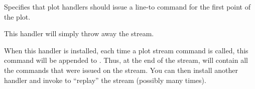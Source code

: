 \begin{command}{\pgfsetlinetofirstplotpoint}
  Specifies that  plot handlers should issue a line-to command for the
  first point of the plot.

\begin{codeexample}[]
\begin{pgfpicture}
  \pgfpathmoveto{\pgfpointorigin}
  \pgfsetlinetofirstplotpoint
  \pgfplothandlerlineto
  \pgfplotstreamstart
  \pgfplotstreampoint{\pgfpoint{1cm}{0cm}}
  \pgfplotstreampoint{\pgfpoint{2cm}{1cm}}
  \pgfplotstreampoint{\pgfpoint{3cm}{2cm}}
  \pgfplotstreampoint{\pgfpoint{1cm}{2cm}}
  \pgfplotstreamend
\end{pgfpicture}
\end{codeexample}
\end{command}

\begin{command}{\pgfplothandlerdiscard}
  This handler will simply throw away the stream.
\end{command}

\begin{command}{\pgfplothandlerrecord{}}
  When this handler is installed, each time a plot stream command is
  called, this command will be appended to . Thus, at
  the end of the stream,  will contain all the
  commands that were issued on the stream. You can then install
  another handler and invoke  to ``replay'' the stream
  (possibly many times).
 
\begin{codeexample}[]
\begin{pgfpicture}
  \pgfplothandlerrecord{\mystream}
  \pgfplotstreamstart
  \pgfplotstreampoint{\pgfpoint{1cm}{0cm}}
  \pgfplotstreampoint{\pgfpoint{2cm}{1cm}}
  \pgfplotstreampoint{\pgfpoint{3cm}{1cm}}
  \pgfplotstreampoint{\pgfpoint{1cm}{2cm}}
  \pgfplotstreamend
  \pgfplothandlerlineto
  \mystream
  \pgfplothandlerclosedcurve
  \mystream
\end{pgfpicture}
\end{codeexample} 
\end{command}

